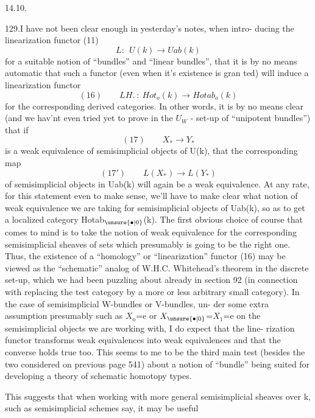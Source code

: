 
14.10.

129.\quad I have not been clear enough in yesterday's notes, when intro-%
ducing the linearization functor (11)
\[ L:\ \ U(k)\longrightarrow Uab(k) \]
for a suitable notion of ``bundles'' and ``linear bundles'', that it is by
no means automatic that such a functor (even when it's existence is gran%
ted) will induce a linearization functor
\[ (16)\qquad LH.\ :\ Hot_{o}(k)\longrightarrow Hotab_{o}(k) \]
for the corresponding derived categories. In other words, it is by no
means clear (and we hav'nt even tried yet to prove in the $U_{W}$ - set-up
of ``unipotent bundles'') that if
\[ (17)\qquad X_{*}\longrightarrow Y_{*} \]
is a weak equivalence of semisimplicial objects of U(k), that the
corresponding map
\[ (17')\qquad L(X_{*})\longrightarrow L(Y_{*}) \]
of semisimplicial objects in Uab(k) will again be a weak equivalence.
At any rate, for this statement even to make sense, we'll have to make
clear what notion of weak equivalence we are taking for  semisimplicial
objects of Uab(k), so as to get a localized category Hotab$_{\unsure{\bullet|0}}$(k). The
first obvious choice of course that comes to mind is to take the notion
of weak equivalence for the corresponding semisimplicial sheaves of sets\hand{,}
which presumably is going to be the right one. Thus, the existence of
a ``homology'' or ``linearization'' functor (16) may be viewed as the
``schematic'' analog of W.H.C. Whitehead's theorem in the discrete set-up,
which we had been puzzling about already in section 92 (in connection
with replacing the test category \hand{$\Delta$} by a more or less arbitrary small
category). In the case of semisimplicial W-bundles or V-bundles, un-%
der some extra assumption presumably such as $X_{o}$=e or $X_{\unsure{\bullet|0}}$=$X_{1}$=e on the
semisimplicial objects we are working with, I do expect that the line-%
rization functor transforms  weak equivalences into
weak equivalences\hand{,} and that the converse holds true too. This seems to
me to be the third main test (besides the two considered on previous
page 541) about a notion of ``bundle'' being suited for developing a
theory of schematic homotopy types.

This suggests that when working with more general semisimplicial
sheaves over k, such as semisimplicial schemes say, it may be useful

